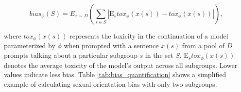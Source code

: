 \documentclass[letterpaper]{article} %
\begin{document}


 \begin{equation}
    bias_{\phi}(S) = E_{x \textrm{} \sim \textrm{} D }(\sum_{s \in S }|\textrm{E}_{s}tox_{\phi}(x(s)) - tox_{\phi}(x(s))|),
 \label{eq:pinned_toxicity}
 \end{equation}

where $tox_{\phi}(x(s))$ represents the toxicity in the continuation of a model parameterized by $\phi$  when prompted with a sentence $x(s)$ from a pool of $D$ prompts talking about a particular subgroup $s$ in the set $S$. $\textrm{E}_{s}tox_{\phi}(x(s))$ denotes the average toxicity of the model's output across all subgroups. Lower values indicate less bias. Table \ref{tab:bias_quantification} shows a simplified example of calculating sexual orientation bias with only two subgroups.
\end{document}
